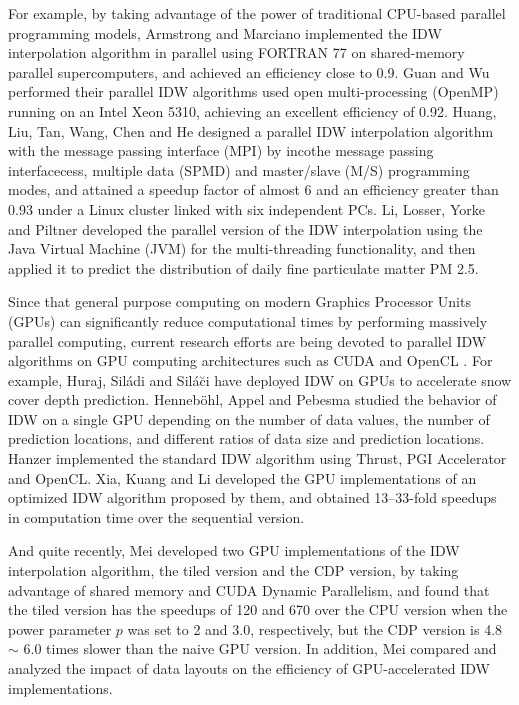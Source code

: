 \documentclass[fleqn,11pt]{wlscirep}
\begin{document}
For example, by taking advantage of the power of traditional CPU-based 
parallel programming models, Armstrong and Marciano \cite{07,08} 
implemented the IDW interpolation algorithm in parallel using FORTRAN 77 on 
shared-memory parallel supercomputers, and achieved an efficiency close to 
0.9. Guan and Wu \cite{09} performed their parallel IDW algorithms 
used open multi-processing (OpenMP) running on an Intel Xeon 5310, achieving 
an excellent efficiency of 0.92. Huang, Liu, Tan, Wang, Chen 
and He \cite{21} designed a parallel IDW interpolation algorithm with the message 
passing interface (MPI) by incothe message passing interfacecess, multiple 
data (SPMD) and master/slave (M/S) programming modes, and attained a speedup 
factor of almost 6 and an efficiency greater than 0.93 under a Linux cluster 
linked with six independent PCs. Li, Losser, Yorke and Piltner \cite{22} developed the parallel 
version of the IDW interpolation using the Java Virtual Machine (JVM) for 
the multi-threading functionality, and then applied it to predict the 
distribution of daily fine particulate matter PM 2.5.


Since that general purpose computing on modern Graphics Processor Units 
(GPUs) can significantly reduce computational times by performing massively 
parallel computing, current research efforts are being devoted to parallel 
IDW algorithms on GPU computing architectures such as CUDA \cite{23}
 and OpenCL \cite{24}. For example, Huraj, Sil\'{a}di and Sil\'{a}\u{c}i \cite{25,26}
have deployed IDW on GPUs to accelerate snow cover depth prediction. 
Henneb\"{o}hl, Appel and Pebesma \cite{13} studied the behavior of IDW on a 
single GPU depending on the number of data values, the number of prediction 
locations, and different ratios of data size and prediction locations. 
Hanzer \cite{27} implemented the standard IDW algorithm using Thrust, PGI 
Accelerator and OpenCL. Xia, Kuang and Li \cite{28,29} developed the GPU 
implementations of an optimized IDW algorithm proposed by them, and obtained 
13--33-fold speedups in computation time over the sequential version.


And quite recently, Mei \cite{30} developed two GPU implementations of 
the IDW interpolation algorithm, the tiled version and the CDP version, by 
taking advantage of shared memory and CUDA Dynamic Parallelism, and found 
that the tiled version has the speedups of 120 and 670 over the CPU 
version when the power parameter $p$ was set to 2 and 3.0, respectively, but the 
CDP version is 4.8 $\sim $ 6.0 times slower than the naive GPU version. In 
addition, Mei \cite{31} compared and analyzed the impact of data layouts 
on the efficiency of GPU-accelerated IDW implementations.
\end{document}

